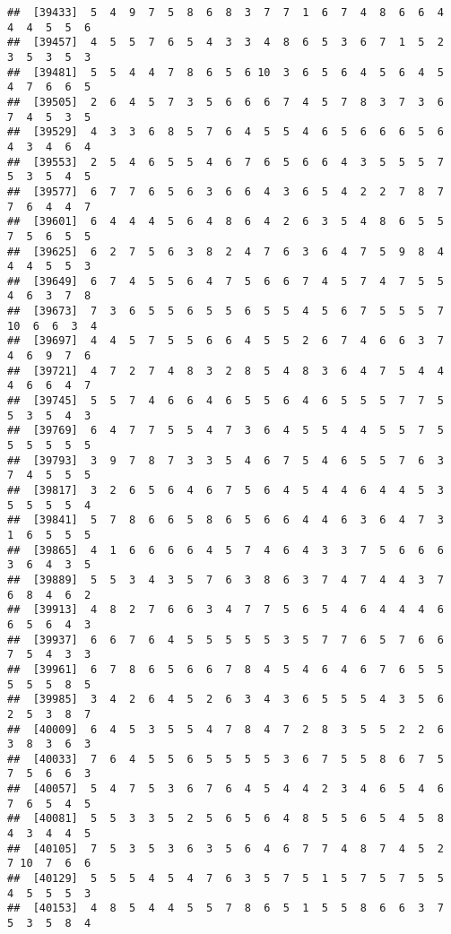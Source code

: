 \documentclass[
]{book}
\begin{document}
\begin{verbatim}
##  [39433]  5  4  9  7  5  8  6  8  3  7  7  1  6  7  4  8  6  6  4  4  4  5  5  6
##  [39457]  4  5  5  7  6  5  4  3  3  4  8  6  5  3  6  7  1  5  2  3  5  3  5  3
##  [39481]  5  5  4  4  7  8  6  5  6 10  3  6  5  6  4  5  6  4  5  4  7  6  6  5
##  [39505]  2  6  4  5  7  3  5  6  6  6  7  4  5  7  8  3  7  3  6  7  4  5  3  5
##  [39529]  4  3  3  6  8  5  7  6  4  5  5  4  6  5  6  6  6  5  6  4  3  4  6  4
##  [39553]  2  5  4  6  5  5  4  6  7  6  5  6  6  4  3  5  5  5  7  5  3  5  4  5
##  [39577]  6  7  7  6  5  6  3  6  6  4  3  6  5  4  2  2  7  8  7  7  6  4  4  7
##  [39601]  6  4  4  4  5  6  4  8  6  4  2  6  3  5  4  8  6  5  5  7  5  6  5  5
##  [39625]  6  2  7  5  6  3  8  2  4  7  6  3  6  4  7  5  9  8  4  4  4  5  5  3
##  [39649]  6  7  4  5  5  6  4  7  5  6  6  7  4  5  7  4  7  5  5  4  6  3  7  8
##  [39673]  7  3  6  5  5  6  5  5  6  5  5  4  5  6  7  5  5  5  7 10  6  6  3  4
##  [39697]  4  4  5  7  5  5  6  6  4  5  5  2  6  7  4  6  6  3  7  4  6  9  7  6
##  [39721]  4  7  2  7  4  8  3  2  8  5  4  8  3  6  4  7  5  4  4  4  6  6  4  7
##  [39745]  5  5  7  4  6  6  4  6  5  5  6  4  6  5  5  5  7  7  5  5  3  5  4  3
##  [39769]  6  4  7  7  5  5  4  7  3  6  4  5  5  4  4  5  5  7  5  5  5  5  5  5
##  [39793]  3  9  7  8  7  3  3  5  4  6  7  5  4  6  5  5  7  6  3  7  4  5  5  5
##  [39817]  3  2  6  5  6  4  6  7  5  6  4  5  4  4  6  4  4  5  3  5  5  5  5  4
##  [39841]  5  7  8  6  6  5  8  6  5  6  6  4  4  6  3  6  4  7  3  1  6  5  5  5
##  [39865]  4  1  6  6  6  6  4  5  7  4  6  4  3  3  7  5  6  6  6  3  6  4  3  5
##  [39889]  5  5  3  4  3  5  7  6  3  8  6  3  7  4  7  4  4  3  7  6  8  4  6  2
##  [39913]  4  8  2  7  6  6  3  4  7  7  5  6  5  4  6  4  4  4  6  6  5  6  4  3
##  [39937]  6  6  7  6  4  5  5  5  5  5  3  5  7  7  6  5  7  6  6  7  5  4  3  3
##  [39961]  6  7  8  6  5  6  6  7  8  4  5  4  6  4  6  7  6  5  5  5  5  5  8  5
##  [39985]  3  4  2  6  4  5  2  6  3  4  3  6  5  5  5  4  3  5  6  2  5  3  8  7
##  [40009]  6  4  5  3  5  5  4  7  8  4  7  2  8  3  5  5  2  2  6  3  8  3  6  3
##  [40033]  7  6  4  5  5  6  5  5  5  5  3  6  7  5  5  8  6  7  5  7  5  6  6  3
##  [40057]  5  4  7  5  3  6  7  6  4  5  4  4  2  3  4  6  5  4  6  7  6  5  4  5
##  [40081]  5  5  3  3  5  2  5  6  5  6  4  8  5  5  6  5  4  5  8  4  3  4  4  5
##  [40105]  7  5  3  5  3  6  3  5  6  4  6  7  7  4  8  7  4  5  2  7 10  7  6  6
##  [40129]  5  5  5  4  5  4  7  6  3  5  7  5  1  5  7  5  7  5  5  4  5  5  5  3
##  [40153]  4  8  5  4  4  5  5  7  8  6  5  1  5  5  8  6  6  3  7  5  3  5  8  4

\end{verbatim}
\end{document}
